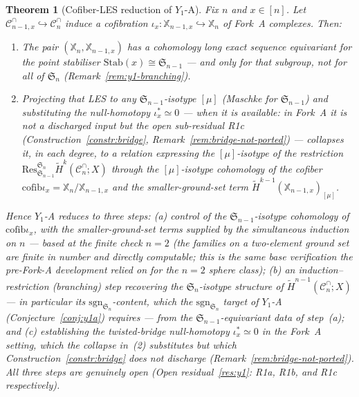 \documentclass[11pt,oneside]{amsart}
\theoremstyle{plain}
\newtheorem{theorem}{Theorem}[section]
\theoremstyle{definition}
\theoremstyle{remark}
\theoremstyle{honeststyle}
\newcommand{\sgn}{\mathrm{sgn}}
\newcommand{\Sym}{\mathfrak{S}}
\newcommand{\Cn}{\mathcal{C}^{\cap}_n}
\newcommand{\Cnm}{\mathcal{C}^{\cap}_{n-1,x}}
\newcommand{\Xbb}{\mathbb{X}}
\newcommand{\cofib}{\mathrm{cofib}}
\begin{document}
\begin{theorem}[Cofiber-LES reduction of $Y_1$-A]
\label{thm:y1-reduction}
Fix $n$ and $x\in[n]$. Let $\Cnm\hookrightarrow\Cn$ induce a
cofibration $\iota_x\colon\Xbb_{n-1,x}\hookrightarrow\Xbb_n$ of Fork~A
complexes. Then:
\begin{enumerate}[label=\textup{(\arabic*)},leftmargin=2.4em]
\item The pair $(\Xbb_n,\Xbb_{n-1,x})$ has a cohomology long exact
  sequence equivariant for the point stabiliser
  $\mathrm{Stab}(x)\cong\Sym_{n-1}$ --- and \emph{only} for that
  subgroup, not for all of $\Sym_n$ (Remark~\ref{rem:y1-branching}).
\item Projecting that LES to any $\Sym_{n-1}$-isotype $[\mu]$ (Maschke
  for $\Sym_{n-1}$) and substituting the null-homotopy
  $\iota_x^{*}\simeq0$ --- \emph{when} it is available: in Fork~A it is
  \emph{not} a discharged input but the open sub-residual R1c
  (Construction~\ref{constr:bridge},
  Remark~\ref{rem:bridge-not-ported}) --- collapses it, in each
  degree, to a relation expressing the $[\mu]$-isotype of the
  restriction $\mathrm{Res}^{\Sym_n}_{\Sym_{n-1}}\widetilde
  H^{k}(\Cn;X)$ through the $[\mu]$-isotype cohomology of the cofiber
  $\cofib\iota_x=\Xbb_n/\Xbb_{n-1,x}$ and the smaller-ground-set term
  $\widetilde H^{k-1}(\Xbb_{n-1,x})_{[\mu]}$.
\end{enumerate}
Hence $Y_1$-A reduces to \emph{three} steps: \textup{(a)} control of
the $\Sym_{n-1}$-isotype cohomology of $\cofib\iota_x$, with the
smaller-ground-set terms supplied by the simultaneous induction on
$n$ --- based at the finite check $n=2$ (the families on a two-element
ground set are finite in number and directly computable; this is the
same base verification the pre-Fork-A development relied on for the
$n=2$ sphere class); \textup{(b)} an induction--restriction
(branching) step recovering the $\Sym_n$-isotype structure of
$\widetilde H^{n-1}(\Cn;X)$ --- in particular its
$\sgn_{\Sym_n}$-content, which the $\sgn_{\Sym_n}$ target of $Y_1$-A
(Conjecture~\ref{conj:y1a}) requires --- from the
$\Sym_{n-1}$-equivariant data of step~(a); and \textup{(c)}
establishing the twisted-bridge null-homotopy $\iota_x^{*}\simeq0$ in
the Fork~A setting, which the collapse in~(2) substitutes but which
Construction~\ref{constr:bridge} does \emph{not} discharge
(Remark~\ref{rem:bridge-not-ported}). All three steps are genuinely
open (Open residual~\ref{res:y1}: R1a, R1b, and R1c respectively).
\end{theorem}
\end{document}
